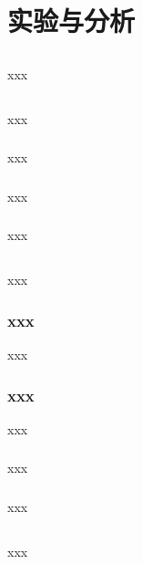 \cleardoublepage            %
\pagestyle{mainstyle}       %

\section{实验与分析}
\subsection{}
xxx

\subsection{}
xxx

\subsubsection{}
xxx

\subsubsection{}
xxx

\subsubsection{}
xxx

\subsection{}
xxx

\subsubsection{xxx}
xxx

\subsubsection{xxx}
xxx

\subsubsection{}
xxx

\subsubsection{}
xxx

\subsection{}
xxx

\clearpage        %
